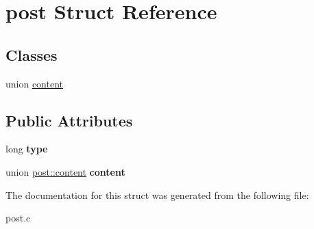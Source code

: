 \hypertarget{structpost}{}\section{post Struct Reference}
\label{structpost}
\subsection*{Classes}
\begin{DoxyCompactItemize}
\item 
union \hyperlink{unionpost_1_1content}{content}
\end{DoxyCompactItemize}
\subsection*{Public Attributes}
\begin{DoxyCompactItemize}
\item 
long {\bfseries type}\hypertarget{structpost_ad65cbec11f3c2a5efcb429b55e99cefa}{}\label{structpost_ad65cbec11f3c2a5efcb429b55e99cefa}

\item 
union \hyperlink{unionpost_1_1content}{post\+::content} {\bfseries content}\hypertarget{structpost_aafcfc848bc9c4704b2f1c8eace1f154b}{}\label{structpost_aafcfc848bc9c4704b2f1c8eace1f154b}

\end{DoxyCompactItemize}


The documentation for this struct was generated from the following file\+:\begin{DoxyCompactItemize}
\item 
post.\+c\end{DoxyCompactItemize}
